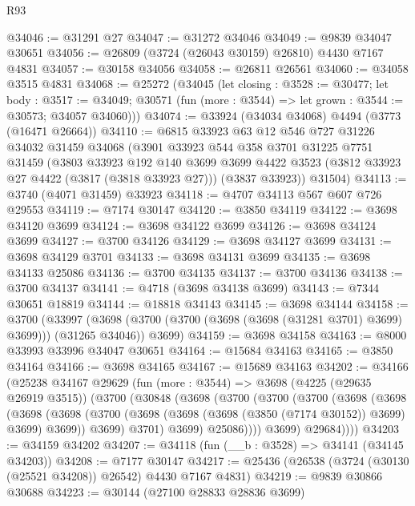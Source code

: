 \begin{lexlean}{R93}
\begin{coremodule}
@34046 := @31291 @27
@34047 := @31272 @34046
@34049 := @9839 @34047 @30651
@34056 := @26809 (@3724 (@26043 @30159) @26810) @4430 @7167 @4831
@34057 := @30158 @34056
@34058 := @26811 @26561
@34060 := @34058 @3515 @4831
@34068 := @25272
    (@34045
      (let closing : @3528 := @30477;
      let body : @3517 := @34049;
      @30571 (fun (more : @3544) => let grown : @3544 := @30573; @34057 @34060)))
@34074 := @33924 (@34034 @34068) @4494 (@3773 (@16471 @26664))
@34110 := @6815
    @33923
    @63
    @12
    @546
    @727
    @31226
    @34032
    @31459
    @34068
    (@3901
      @33923
      @544
      @358
      @3701
      @31225
      @7751
      @31459
      (@3803
        @33923
        @192
        @140
        @3699
        @3699
        @4422
        @3523
        (@3812 @33923 @27 @4422 (@3817 (@3818 @33923 @27)))
        (@3837 @33923))
      @31504)
@34113 := @3740 (@4071 @31459) @33923
@34118 := @4707 @34113 @567 @607 @726 @29553
@34119 := @7174 @30147
@34120 := @3850 @34119
@34122 := @3698 @34120 @3699
@34124 := @3698 @34122 @3699
@34126 := @3698 @34124 @3699
@34127 := @3700 @34126
@34129 := @3698 @34127 @3699
@34131 := @3698 @34129 @3701
@34133 := @3698 @34131 @3699
@34135 := @3698 @34133 @25086
@34136 := @3700 @34135
@34137 := @3700 @34136
@34138 := @3700 @34137
@34141 := @4718 (@3698 @34138 @3699)
@34143 := @7344 @30651 @18819
@34144 := @18818 @34143
@34145 := @3698 @34144
@34158 := @3700
    (@33997
      (@3698 (@3700 (@3700 (@3698 (@3698 (@31281 @3701) @3699) @3699))) (@31265 @34046))
      @3699)
@34159 := @3698 @34158
@34163 := @8000 @33993 @33996 @34047 @30651
@34164 := @15684 @34163
@34165 := @3850 @34164
@34166 := @3698 @34165
@34167 := @15689 @34163
@34202 := @34166
    (@25238
      @34167
      @29629
      (fun (more : @3544) =>
      @3698
        (@4225 (@29635 @26919 @3515))
        (@3700
          (@30848
            (@3698
              (@3700
                (@3700
                  (@3700
                    (@3698
                      (@3698
                        (@3698
                          (@3698
                            (@3700 (@3698 (@3698 (@3698 (@3850 (@7174 @30152)) @3699) @3699) @3699))
                            @3699)
                          @3701)
                        @3699)
                      @25086))))
              @3699)
            @29684))))
@34203 := @34159 @34202
@34207 := @34118 (fun (__b : @3528) => @34141 (@34145 @34203))
@34208 := @7177 @30147
@34217 := @25436 (@26538 (@3724 (@30130 (@25521 @34208)) @26542) @4430 @7167 @4831)
@34219 := @9839 @30866 @30688
@34223 := @30144 (@27100 @28833 @28836 @3699)

\end{coremodule}
\end{lexlean}
